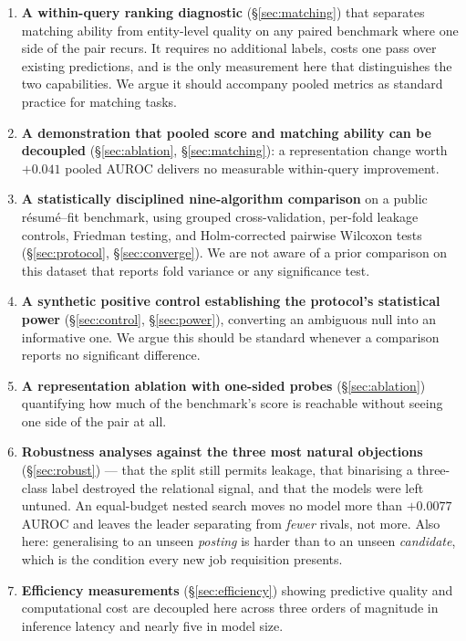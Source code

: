 \documentclass[11pt]{article}                      %
\begin{document}
\begin{enumerate}
\item \textbf{A within-query ranking diagnostic} (\S\ref{sec:matching}) that
separates matching ability from entity-level quality on any paired benchmark
where one side of the pair recurs. It requires no additional labels, costs one
pass over existing predictions, and is the only measurement here that
distinguishes the two capabilities. We argue it should accompany pooled metrics
as standard practice for matching tasks.

\item \textbf{A demonstration that pooled score and matching ability can be
decoupled} (\S\ref{sec:ablation}, \S\ref{sec:matching}): a representation change
worth $+0.041$ pooled AUROC delivers no measurable within-query improvement.

\item \textbf{A statistically disciplined nine-algorithm comparison} on a public
résumé--fit benchmark, using grouped cross-validation, per-fold leakage controls,
Friedman testing, and Holm-corrected pairwise Wilcoxon tests
(\S\ref{sec:protocol}, \S\ref{sec:converge}). We are not aware of a prior
comparison on this dataset that reports fold variance or any significance test.

\item \textbf{A synthetic positive control establishing the protocol's
statistical power} (\S\ref{sec:control}, \S\ref{sec:power}), converting an
ambiguous null into an informative one. We argue this should be standard whenever
a comparison reports no significant difference.

\item \textbf{A representation ablation with one-sided probes}
(\S\ref{sec:ablation}) quantifying how much of the benchmark's score is reachable
without seeing one side of the pair at all.

\item \textbf{Robustness analyses against the three most natural objections}
(\S\ref{sec:robust}) --- that the split still permits leakage, that binarising a
three-class label destroyed the relational signal, and that the models were left
untuned. An equal-budget nested search moves no model more than $+0.0077$ AUROC
and leaves the leader separating from \emph{fewer} rivals, not more. Also here:
generalising to an unseen \emph{posting} is harder than to an unseen
\emph{candidate}, which is the condition every new job requisition presents.

\item \textbf{Efficiency measurements} (\S\ref{sec:efficiency}) showing
predictive quality and computational cost are decoupled here across three orders
of magnitude in inference latency and nearly five in model size.


\end{enumerate}
\end{document}
